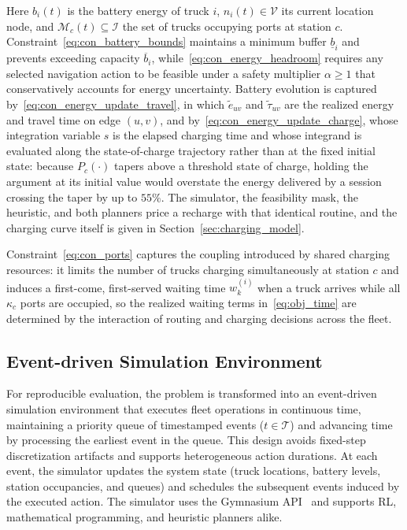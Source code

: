 \documentclass[journal]{IEEEtran}
\begin{document}
Here $b_i(t)$ is the battery energy of truck $i$, $n_i(t)\in\mathcal{V}$ its current location node, and $\mathcal{M}_c(t)\subseteq\mathcal{I}$ the set of trucks occupying ports at station $c$. Constraint~\eqref{eq:con_battery_bounds} maintains a minimum buffer $\underline b_i$ and prevents exceeding capacity $\overline{b}_i$, while~\eqref{eq:con_energy_headroom} requires any selected navigation action to be feasible under a safety multiplier $\alpha\ge 1$ that conservatively accounts for energy uncertainty. Battery evolution is captured by~\eqref{eq:con_energy_update_travel}, in which $\tilde{e}_{uv}$ and $\tilde{\tau}_{uv}$ are the realized energy and travel time on edge $(u,v)$, and by~\eqref{eq:con_energy_update_charge}, whose integration variable $s$ is the elapsed charging time and whose integrand is evaluated along the state-of-charge trajectory rather than at the fixed initial state: because $P_c(\cdot)$ tapers above a threshold state of charge, holding the argument at its initial value would overstate the energy delivered by a session crossing the taper by up to $55\%$. The simulator, the feasibility mask, the heuristic, and both planners price a recharge with that identical routine, and the charging curve itself is given in Section~\ref{sec:charging_model}.

Constraint~\eqref{eq:con_ports} captures the coupling introduced by shared charging resources: it limits the number of trucks charging simultaneously at station $c$ and induces a first-come, first-served waiting time $w_k^{(i)}$ when a truck arrives while all $\kappa_c$ ports are occupied, so the realized waiting terms in~\eqref{eq:obj_time} are determined by the interaction of routing and charging decisions across the fleet.


\subsection{Event-driven Simulation Environment}\label{sec:sim_env}

For reproducible evaluation, the problem is transformed into an event-driven simulation environment that executes fleet operations in continuous time, maintaining a priority queue of timestamped events ($t\in\mathcal{T}$) and advancing time by processing the earliest event in the queue. This design avoids fixed-step discretization artifacts and supports heterogeneous action durations. At each event, the simulator updates the system state (truck locations, battery levels, station occupancies, and queues) and schedules the subsequent events induced by the executed action.
The simulator uses the Gymnasium API~\cite{brockman2016openai} and supports RL, mathematical programming, and heuristic planners alike.
\end{document}
